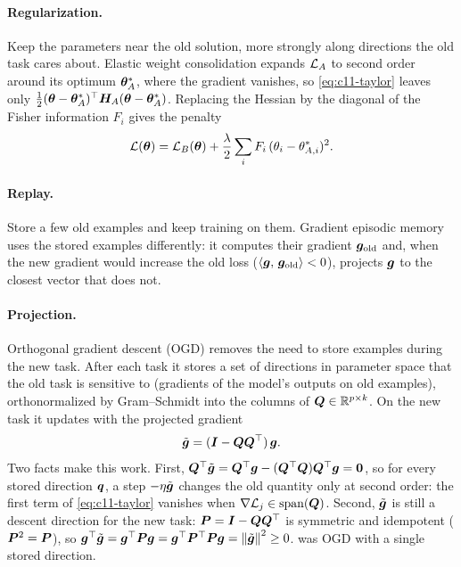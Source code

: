 \paragraph{Regularization.} Keep the parameters near the old solution, more strongly along
directions the old task cares about. Elastic weight consolidation \citep{c02-kirkpatrick2017ewc}
expands $\mathcal{L}_A$ to second order around its optimum $\bm{\theta}_A^*$, where the gradient vanishes,
so \cref{eq:c11-taylor} leaves only $\tfrac12(\bm{\theta}-\bm{\theta}_A^*)^{\top}\bm{H}_A(\bm{\theta}-\bm{\theta}_A^*)$.
Replacing the Hessian by the diagonal of the Fisher information $F_i$ gives the penalty
\begin{equation}
  \mathcal{L}(\bm{\theta}) = \mathcal{L}_B(\bm{\theta}) + \frac{\lambda}{2}\sum_i F_i\,(\theta_i - \theta^*_{A,i})^2 .
  \label{eq:c11-ewc}
\end{equation}

\paragraph{Replay.} Store a few old examples and keep training on them. Gradient episodic memory
\citep{c02-lopezpaz2017gem} uses the stored examples differently: it computes their gradient
$\bm{g}_{\text{old}}$ and, when the new gradient would increase the old loss
($\left\langle \bm{g},\, \bm{g}_{\text{old}}\right\rangle < 0$), projects $\bm{g}$ to the closest vector that does not.

\paragraph{Projection.} Orthogonal gradient descent (OGD) \citep{c11-farajtabar2020ogd} removes
the need to store examples during the new task. After each task it stores a set of directions in
parameter space that the old task is sensitive to (gradients of the model's outputs on old
examples), orthonormalized by Gram--Schmidt into the columns of $\bm{Q} \in \mathbb{R}^{p\times k}$. On the
new task it updates with the projected gradient
\begin{equation}
  \tilde{\bm{g}} = (\bm{I} - \bm{Q}\bm{Q}^{\top})\,\bm{g} .
  \label{eq:c11-ogd}
\end{equation}
Two facts make this work. First, $\bm{Q}^{\top}\tilde{\bm{g}} = \bm{Q}^{\top}\bm{g} - (\bm{Q}^{\top}\bm{Q})\bm{Q}^{\top}\bm{g} = \bm{0}$, so
for every stored direction $\bm{q}$, a step $-\eta\tilde{\bm{g}}$ changes the old quantity only at
second order: the first term of \cref{eq:c11-taylor} vanishes when $\nabla\mathcal{L}_j \in
\operatorname{span}(\bm{Q})$. Second, $\tilde{\bm{g}}$ is still a descent direction for the new task:
$\bm{P} = \bm{I} - \bm{Q}\bm{Q}^{\top}$ is symmetric and idempotent ($\bm{P}^2 = \bm{P}$), so
$\bm{g}^{\top}\tilde{\bm{g}} = \bm{g}^{\top}\bm{P}\bm{g} = \bm{g}^{\top}\bm{P}^{\top}\bm{P}\bm{g} = \left\lVert \tilde{\bm{g}}\right\rVert^2 \ge 0$. 
was OGD with a single stored direction.

